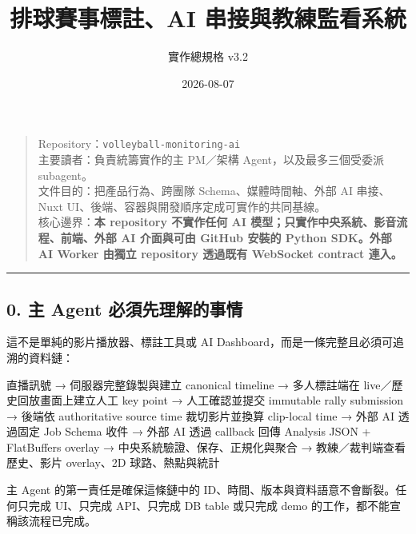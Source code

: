 \documentclass[
  9pt,
  a4paper,
]{article}
\title{排球賽事標註、AI 串接與教練監看系統}
\subtitle{實作總規格 v3.2}
\author{}
\date{2026-08-07}
\newenvironment{Shaded}{}{}
\newcommand{\NormalTok}[1]{#1}
\begin{document}
\maketitle

\renewcommand*\contentsname{目錄}
{
\hypersetup{linkcolor=}
\setcounter{tocdepth}{3}
\tableofcontents
}
\begin{quote}
Repository：\texttt{volleyball-monitoring-ai}\\
主要讀者：負責統籌實作的主 PM／架構 Agent，以及最多三個受委派
subagent。\\
文件目的：把產品行為、跨團隊 Schema、媒體時間軸、外部 AI 串接、Nuxt
UI、後端、容器與開發順序定成可實作的共同基線。\\
核心邊界：\textbf{本 repository 不實作任何 AI
模型；只實作中央系統、影音流程、前端、外部 AI 介面與可由 GitHub 安裝的 Python
SDK。外部 AI Worker 由獨立 repository 透過既有 WebSocket contract 連入。}
\end{quote}

\begin{center}\rule{0.5\linewidth}{0.5pt}\end{center}

\subsection{0. 主 Agent
必須先理解的事情}\label{0-ux4e3b-agent-ux5fc5ux9808ux5148ux7406ux89e3ux7684ux4e8bux60c5}

這不是單純的影片播放器、標註工具或 AI
Dashboard，而是一條完整且必須可追溯的資料鏈：

\begin{Shaded}
\begin{Highlighting}[]
\NormalTok{直播訊號}
\NormalTok{→ 伺服器完整錄製與建立 canonical timeline}
\NormalTok{→ 多人標註端在 live／歷史回放畫面上建立人工 key point}
\NormalTok{→ 人工確認並提交 immutable rally submission}
\NormalTok{→ 後端依 authoritative source time 裁切影片並換算 clip{-}local time}
\NormalTok{→ 外部 AI 透過固定 Job Schema 收件}
\NormalTok{→ 外部 AI 透過 callback 回傳 Analysis JSON + FlatBuffers overlay}
\NormalTok{→ 中央系統驗證、保存、正規化與聚合}
\NormalTok{→ 教練／裁判端查看歷史、影片 overlay、2D 球路、熱點與統計}
\end{Highlighting}
\end{Shaded}

主 Agent 的第一責任是確保這條鏈中的
ID、時間、版本與資料語意不會斷裂。任何只完成 UI、只完成 API、只完成 DB
table 或只完成 demo 的工作，都不能宣稱該流程已完成。
\end{document}
